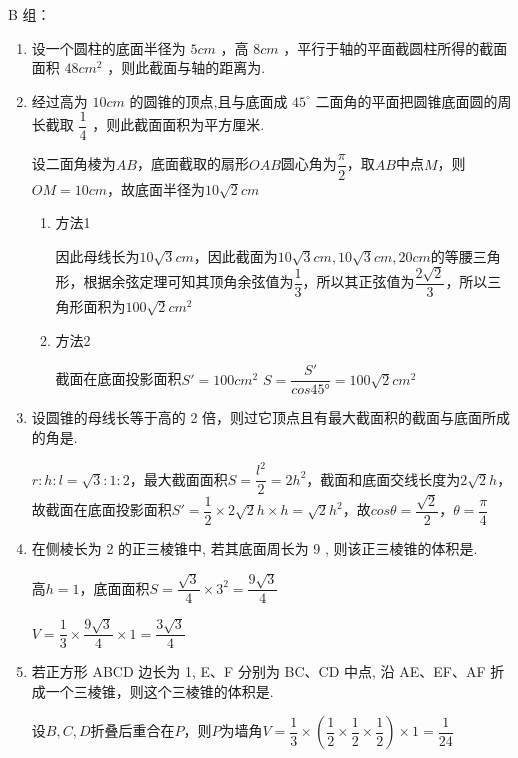 B 组：
\begin{enumerate}
    \item 设一个圆柱的底面半径为 $5{{cm}}$ ，高 $8{{cm}}$ ，平行于轴的平面截圆柱所得的截面面积 ${48c}{m}^{2}$ ，则此截面与轴的距离为\blkda{$4cm$}.

    \item 经过高为 ${10cm}$ 的圆锥的顶点,且与底面成 ${45}^{ \circ  }$ 二面角的平面把圆锥底面圆的周长截取 $\dfrac{1}{4}$ ，则此截面面积为平方厘米.
    \begin{jieda}
        设二面角棱为$AB$，底面截取的扇形$OAB$圆心角为$\dfrac{\pi}{2}$，取$AB$中点$M$，则$OM = 10cm$，故底面半径为$10\sqrt{2} cm$
        \begin{enumerate}
            \item 方法1

            因此母线长为$10\sqrt{3} cm$，因此截面为$10\sqrt{3}cm, 10\sqrt{3}cm, 20cm$的等腰三角形，根据余弦定理可知其顶角余弦值为$\dfrac{1}{3}$，所以其正弦值为$\dfrac{2\sqrt{2}}{3}$，所以三角形面积为$100\sqrt{2} cm^2$
            
            \item 方法2

            截面在底面投影面积$S' = 100cm^2$
            $S = \dfrac{S'}{cos\ang{45}} = 100\sqrt{2} cm^2$
        \end{enumerate}
    \end{jieda}

    \item 设圆锥的母线长等于高的 2 倍，则过它顶点且有最大截面积的截面与底面所成的角是.
    \begin{jieda}
        $r:h:l = \sqrt{3}:1:2$，最大截面面积$S = \dfrac{l^2}{2} = 2h^2$，截面和底面交线长度为$2\sqrt{2}h$，故截面在底面投影面积$S' = \dfrac{1}{2} \times 2\sqrt{2}h \times h = \sqrt{2}h^2$，故$cos\theta = \dfrac{\sqrt{2}}{2}$，$\theta = \dfrac{\pi}{4}$
    \end{jieda}

    \item 在侧棱长为 2 的正三棱锥中, 若其底面周长为 9 , 则该正三棱锥的体积是.
    \begin{jieda}
        高$h = 1$，底面面积$S = \dfrac{\sqrt{3}}{4} \times 3^2 = \dfrac{9\sqrt{3}}{4}$
        
        $V = \dfrac{1}{3} \times \dfrac{9\sqrt{3}}{4} \times 1 = \dfrac{3\sqrt{3}}{4}$
    \end{jieda}

    \item 若正方形 ABCD 边长为 1, E、F 分别为 BC、CD 中点, 沿 AE、EF、AF 折成一个三棱锥，则这个三棱锥的体积是.
    \begin{jieda}
        设$B,C,D$折叠后重合在$P$，则$P$为墙角$V = \dfrac{1}{3} \times \left(\dfrac{1}{2} \times \dfrac{1}{2} \times \dfrac{1}{2}\right) \times 1 = \dfrac{1}{24}$
    \end{jieda}


\end{enumerate}
